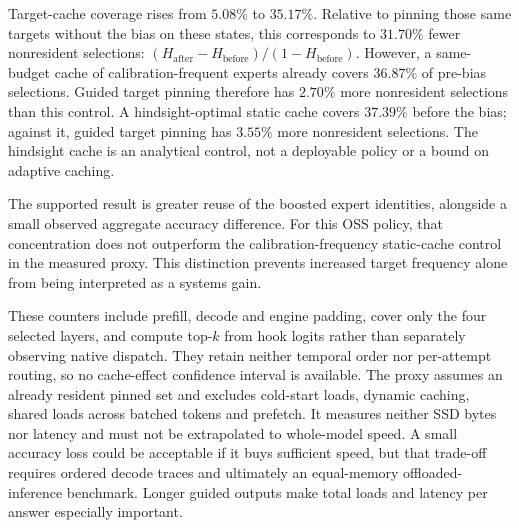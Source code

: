 Target-cache coverage rises from $5.08\%$ to $35.17\%$. Relative to pinning
those same targets without the bias on these states, this corresponds to
$31.70\%$ fewer nonresident selections:
$(H_{\mathrm{after}}-H_{\mathrm{before}})/(1-H_{\mathrm{before}})$.
However, a same-budget cache of calibration-frequent experts already covers
$36.87\%$ of pre-bias selections. Guided target pinning therefore has
$2.70\%$ more nonresident selections than this control. A hindsight-optimal
static cache covers $37.39\%$ before the bias; against it, guided target
pinning has $3.55\%$ more nonresident selections. The hindsight cache is an
analytical control, not a deployable policy or a bound on adaptive caching.

The supported result is greater reuse of the boosted expert identities,
alongside a small observed aggregate accuracy difference. For this OSS
policy, that concentration does not outperform the calibration-frequency
static-cache control in the measured proxy. This distinction prevents
increased target frequency alone from being interpreted as a systems gain.

These counters include prefill, decode and engine padding, cover only the
four selected layers, and compute top-$k$ from hook logits rather than
separately observing native dispatch. They retain neither temporal order
nor per-attempt routing, so no cache-effect confidence interval is available.
The proxy assumes an already resident pinned set and excludes cold-start
loads, dynamic caching, shared loads across batched tokens and prefetch.
It measures neither SSD bytes nor latency and must not be extrapolated to
whole-model speed. A small accuracy loss could be acceptable if it buys
sufficient speed, but that trade-off requires ordered decode traces and
ultimately an equal-memory offloaded-inference benchmark. Longer guided
outputs make total loads and latency per answer especially important.
